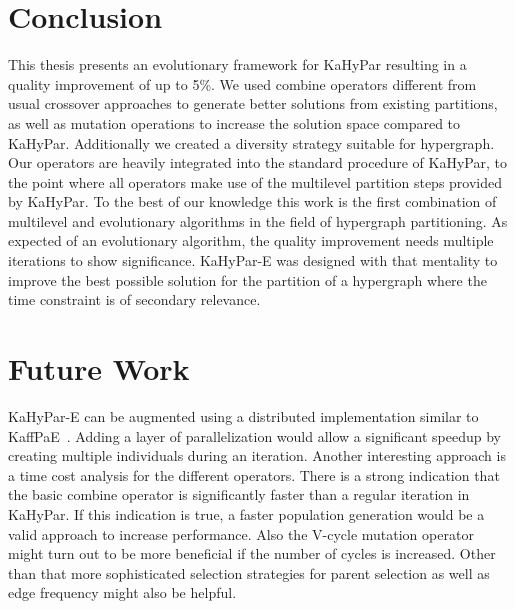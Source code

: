 \documentclass[a4paper,12pt,titlepage, BCOR7mm,headsepline]{scrbook}
\numberwithin{equation}{section}
\begin{document}
\section{Conclusion}
This thesis presents an evolutionary framework for KaHyPar resulting in a quality improvement of up to 5\%. We used combine operators different from usual crossover approaches to generate better solutions from existing partitions, as well as mutation operations to increase the solution space compared to KaHyPar. Additionally we created a diversity strategy suitable for hypergraph. Our operators are heavily integrated into the standard procedure of KaHyPar, to the point where all operators make use of the multilevel partition steps provided by KaHyPar. To the best of our knowledge this work is the first combination of multilevel and evolutionary algorithms in the field of hypergraph partitioning.
As expected of an evolutionary algorithm, the quality improvement needs multiple iterations to show significance. KaHyPar-E was designed with that mentality to improve the best possible solution for the partition of a hypergraph where the time constraint is of secondary relevance. 
\section{Future Work}
KaHyPar-E can be augmented using a distributed implementation similar to KaffPaE~\cite{sanders2012distributed}. Adding a layer of parallelization would allow a significant speedup by creating multiple individuals during an iteration. Another interesting approach is a time cost analysis for the different operators. There is a strong indication that the basic combine operator is significantly faster than a regular iteration in KaHyPar. If this indication is true, a faster population generation would be a valid approach to increase performance. Also the V-cycle mutation operator might turn out to be more beneficial if the number of cycles is increased. Other than that more sophisticated selection strategies for parent selection as well as edge frequency might also be helpful. %
\end{document}
